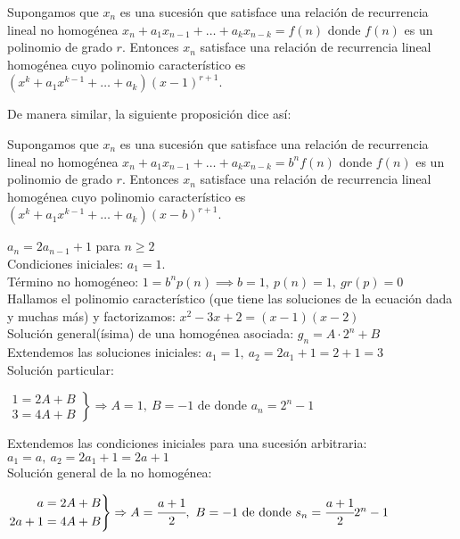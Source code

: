 \begin{nprop}
    Supongamos que $x_n$ es una sucesión que satisface una relación de recurrencia lineal no homogénea
    $x_n + a_1x_{n-1} + \ldots + a_kx_{n-k} = f(n)$ donde $f(n)$ es un polinomio de grado $r$. Entonces $x_n$ satisface una relación de recurrencia lineal homogénea cuyo polinomio característico es
    $(x^k + a_1x^{k-1} + \ldots + a_k)(x - 1)^{r+1}$.
\end{nprop}

De manera similar, la siguiente proposición dice así:
\begin{nprop}
    Supongamos que $x_n$ es una sucesión que satisface una relación de recurrencia lineal no homogénea
    $x_n + a_1x_{n-1} + \ldots + a_kx_{n-k} = b^nf(n)$ donde $f(n)$ es un polinomio de grado $r$. Entonces $x_n$ satisface una relación de recurrencia lineal homogénea cuyo polinomio característico es
    $(x^k + a_1x^{k-1} + \ldots + a_k)(x - b)^{r+1}$.
\end{nprop}

\begin{ejemplo} $a_{n} = 2a_{n-1} + 1$ para $n \geq 2$ \\
    Condiciones iniciales: $a_{1} = 1$.\\
    Término no homogéneo: $1 = b^np(n) \implies b = 1, \ p(n) = 1, \ gr(p) = 0$ \\
    Hallamos el polinomio característico (que tiene las soluciones de la ecuación dada y muchas más) y factorizamos: $x^2 -3x + 2 = (x-1)(x-2)$\\
    Solución general(ísima) de una homogénea asociada: $g_{n} = A \cdot 2^n + B$ \\
    Extendemos las soluciones iniciales: $a_1 = 1, \ a_2 = 2a_1 +1 = 2 + 1 = 3$ \\
    Solución particular:
    \begin{center}
        $\left.
            \begin{aligned}
                1 = 2A + B \\
                3 = 4A + B
            \end{aligned} \right \}
            \Rightarrow A = 1 , \ B = -1 \text{ de donde } a_n = 2^n - 1$
    \end{center}
    Extendemos las condiciones iniciales para una sucesión arbitraria: $a_1 = a, \ a_2 = 2a_1 + 1 = 2a + 1$ \\
    Solución general  de la no homogénea:
    \begin{center}
        $\left.
            \begin{aligned}
                a = 2A + B \\
                2a + 1 = 4A + B
            \end{aligned} \right \}
            \Rightarrow A = \cfrac{a+1}{2}, \ B = -1 \text{ de donde } s_n = \cfrac{a+1}{2}2^n - 1$
    \end{center}
\end{ejemplo}
\smallskip


